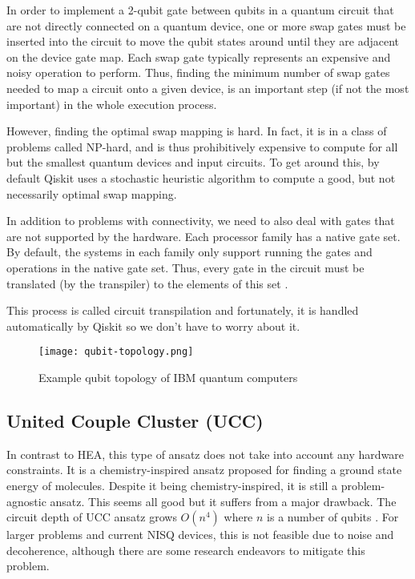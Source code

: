 In order to implement a 2-qubit gate between qubits in a quantum circuit that are not directly connected on a quantum device, one or more swap gates must be inserted into the circuit to move the qubit states around until they are adjacent on the device gate map. Each swap gate typically represents an expensive and noisy operation to perform. Thus, finding the minimum number of swap gates needed to map a circuit onto a given device, is an important step (if not the most important) in the whole execution process.~\cite{transpiler}

However, finding the optimal swap mapping is hard. In fact, it is in a class of problems called NP-hard, and is thus prohibitively expensive to compute for all but the smallest quantum devices and input circuits. To get around this, by default Qiskit uses a stochastic heuristic algorithm to compute a good, but not necessarily optimal swap mapping.~\cite{transpiler} 

In addition to problems with connectivity, we need to also deal with gates that are not supported by the hardware. Each processor family has a native gate set. By default, the systems in each family only support running the gates and operations in the native gate set. Thus, every gate in the circuit must be translated (by the transpiler) to the elements of this set \cite{native_gates}.

This process is called circuit transpilation and fortunately, it is handled automatically by Qiskit so we don't have to worry about it. 
\begin{figure}[H]
    \texttt{[image: qubit-topology.png]}
    \caption{Example qubit topology of IBM quantum computers}
\end{figure}



\subsection{United Couple Cluster (UCC)}
In contrast to HEA, this type of ansatz does not take into account any hardware constraints. It is a chemistry-inspired ansatz proposed for finding a ground state energy of molecules. Despite it being chemistry-inspired, it is still a problem-agnostic ansatz. This seems all good but it suffers from a major drawback. The circuit depth of UCC ansatz grows $O(n^4)$ where $n$ is a number of qubits \cite{ucc_ansatz}. For larger problems and current NISQ devices, this is not feasible due to noise and decoherence, although there are some research endeavors to mitigate this problem.
  
